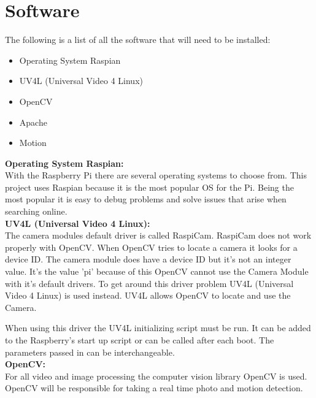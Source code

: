 \documentclass[]{report}
\begin{document}
\section{Software}	
\label{sec:software}	
The following is a list of all the software that will need to be installed:
\begin{itemize}
  \item Operating System Raspian \\
  \item UV4L (Universal Video 4 Linux)\\  
  \item OpenCV\\
  \item Apache\\
  \item Motion\\
\end{itemize}

\noindent
{\bf Operating System Raspian:}\\
\break
With the Raspberry Pi there are several operating systems to choose from. This project uses Raspian because it is the most popular OS for the Pi. Being the most popular it is easy to debug problems and solve issues that arise when searching online.\\ 

\noindent
{\bf UV4L (Universal Video 4 Linux):}\\
\break
The camera modules default driver is called RaspiCam. RaspiCam does not work properly with OpenCV. When OpenCV tries to locate a camera it looks for a device ID. The camera module does have a device ID but it's not an integer value. It's the value 'pi' because of this OpenCV cannot use the Camera Module with it's default drivers. To get around this driver problem UV4L (Universal Video 4 Linux) is used instead. UV4L allows OpenCV to locate and use the Camera.

When using this driver the UV4L initializing script must be run. It can be added to the Raspberry's start up script or can be called after each boot. The parameters passed in can be interchangeable.\\

\noindent
{\bf OpenCV:}\\
\break
For all video and image processing the computer vision library OpenCV is used.\\

OpenCV will be responsible for taking a real time photo and motion detection.\\
\end{document}
